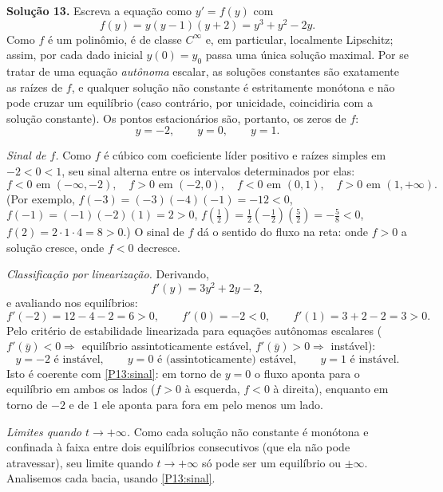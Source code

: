 \bigskip\noindent\textbf{Solução 13.}\quad
Escreva a equação como $y'=f(y)$ com
\[
f(y)=y(y-1)(y+2)=y^3+y^2-2y .
\]
Como $f$ é um polinômio, é de classe $C^\infty$ e, em particular, localmente Lipschitz; assim, por cada dado inicial $y(0)=y_0$ passa uma única solução maximal. Por se tratar de uma equação \emph{autônoma} escalar, as soluções constantes são exatamente as raízes de $f$, e qualquer solução não constante é estritamente monótona e não pode cruzar um equilíbrio (caso contrário, por unicidade, coincidiria com a solução constante). Os pontos estacionários são, portanto, os zeros de $f$:
\[
y=-2,\qquad y=0,\qquad y=1 .
\]

\medskip\noindent\emph{Sinal de $f$.}
Como $f$ é cúbico com coeficiente líder positivo e raízes simples em $-2<0<1$, seu sinal alterna entre os intervalos determinados por elas:
\begin{equation}\label{P13:sinal}
f<0 \text{ em } (-\infty,-2),\quad f>0 \text{ em } (-2,0),\quad f<0 \text{ em } (0,1),\quad f>0 \text{ em } (1,+\infty).
\end{equation}
(Por exemplo, $f(-3)=(-3)(-4)(-1)=-12<0$, $f(-1)=(-1)(-2)(1)=2>0$, $f(\tfrac12)=\tfrac12(-\tfrac12)(\tfrac52)=-\tfrac58<0$, $f(2)=2\cdot1\cdot4=8>0$.) O sinal de $f$ dá o sentido do fluxo na reta: onde $f>0$ a solução cresce, onde $f<0$ decresce.

\medskip\noindent\emph{Classificação por linearização.}
Derivando,
\[
f'(y)=3y^2+2y-2 ,
\]
e avaliando nos equilíbrios:
\[
f'(-2)=12-4-2=6>0,\qquad f'(0)=-2<0,\qquad f'(1)=3+2-2=3>0 .
\]
Pelo critério de estabilidade linearizada para equações autônomas escalares ($f'(\bar y)<0\Rightarrow$ equilíbrio assintoticamente estável, $f'(\bar y)>0\Rightarrow$ instável):
\[
y=-2 \text{ é instável},\qquad y=0 \text{ é (assintoticamente) estável},\qquad y=1 \text{ é instável}.
\]
Isto é coerente com \eqref{P13:sinal}: em torno de $y=0$ o fluxo aponta para o equilíbrio em ambos os lados ($f>0$ à esquerda, $f<0$ à direita), enquanto em torno de $-2$ e de $1$ ele aponta para fora em pelo menos um lado.

\medskip\noindent\emph{Limites quando $t\to+\infty$.}
Como cada solução não constante é monótona e confinada à faixa entre dois equilíbrios consecutivos (que ela não pode atravessar), seu limite quando $t\to+\infty$ só pode ser um equilíbrio ou $\pm\infty$. Analisemos cada bacia, usando \eqref{P13:sinal}.

